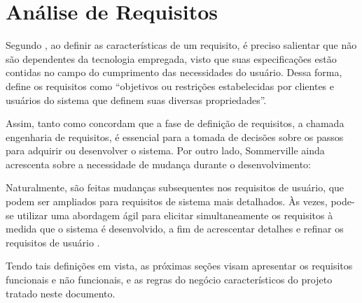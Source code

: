 

\section{Análise de Requisitos}
Segundo , ao definir as características de um requisito, é preciso salientar que não são dependentes da tecnologia empregada, visto que suas especificações estão contidas no campo do cumprimento das necessidades do usuário. Dessa forma,   define os requisitos como ``objetivos ou restrições estabelecidas por clientes e usuários do sistema que definem suas diversas propriedades''.

Assim, tanto  como  concordam que a fase de definição de requisitos, a chamada engenharia de requisitos, é essencial para a tomada de decisões sobre os passos para adquirir ou desenvolver o sistema. Por outro lado, Sommerville ainda acrescenta sobre a necessidade de mudança durante o desenvolvimento:

\begin{citacao}
Naturalmente, são feitas mudanças subsequentes nos requisitos de usuário, que podem ser ampliados para requisitos de sistema mais detalhados. Às vezes, pode-se utilizar uma abordagem ágil para elicitar simultaneamente os requisitos à medida que o sistema é desenvolvido, a fim de acrescentar detalhes e refinar os requisitos de usuário \cite{SOMMERVILLE:2019}.
\end{citacao}

Tendo tais definições em vista, as próximas seções visam apresentar os requisitos funcionais e não funcionais, e as regras do negócio característicos do projeto tratado neste documento. 


